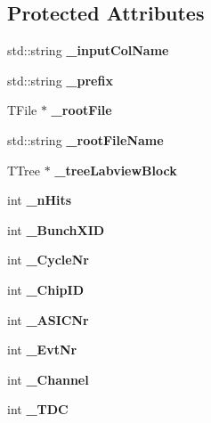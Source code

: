 \subsection*{Protected Attributes}
\begin{CompactItemize}
\item 
std::string \bf{\_\-input\-Col\-Name}\label{classCALICE_1_1RootTreeGenerator_6e3ccdee44a36637ec5f82b38613aa80}

\item 
std::string \bf{\_\-prefix}\label{classCALICE_1_1RootTreeGenerator_69f6ddf768ba21e11e72ce8e5efba610}

\item 
TFile $\ast$ \bf{\_\-root\-File}\label{classCALICE_1_1RootTreeGenerator_ba6d91d1711bf79073a6fc66c89b7cf2}

\item 
std::string \bf{\_\-root\-File\-Name}\label{classCALICE_1_1RootTreeGenerator_260eeab9bd8a73bbdeb2386b1a2f9100}

\item 
TTree $\ast$ \bf{\_\-tree\-Labview\-Block}\label{classCALICE_1_1RootTreeGenerator_df2fbfdedc2abfd463e7ffbe0d277841}

\item 
int \bf{\_\-n\-Hits}\label{classCALICE_1_1RootTreeGenerator_5d5296e7d128ed4965c3ebd44d6883d0}

\item 
int \bf{\_\-Bunch\-XID}\label{classCALICE_1_1RootTreeGenerator_09a994142a4a861b92e97de8dec6fb70}

\item 
int \bf{\_\-Cycle\-Nr}\label{classCALICE_1_1RootTreeGenerator_46fb27402d692084f748a4cea88a4866}

\item 
int \bf{\_\-Chip\-ID}\label{classCALICE_1_1RootTreeGenerator_df053f25a33e93fc21b348ea4c15e3ad}

\item 
int \bf{\_\-ASICNr}\label{classCALICE_1_1RootTreeGenerator_d4807c84723ab8b1ffe0b6afc7b06627}

\item 
int \bf{\_\-Evt\-Nr}\label{classCALICE_1_1RootTreeGenerator_b1d7f8094a5df61ad65266c42106e5ab}

\item 
int \bf{\_\-Channel}\label{classCALICE_1_1RootTreeGenerator_e0e0671eb00d7bf1682bbb1aae0ecde4}

\item 
int \bf{\_\-TDC}\label{classCALICE_1_1RootTreeGenerator_b3f8c347923dd4ab60d3607fdf07e957}


\end{CompactItemize}
